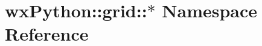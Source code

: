 \hypertarget{namespacewxPython_1_1grid_1_1_5}{
\section{wx\-Python::grid::$\ast$ Namespace Reference}
\label{namespacewxPython_1_1grid_1_1_5}
}


